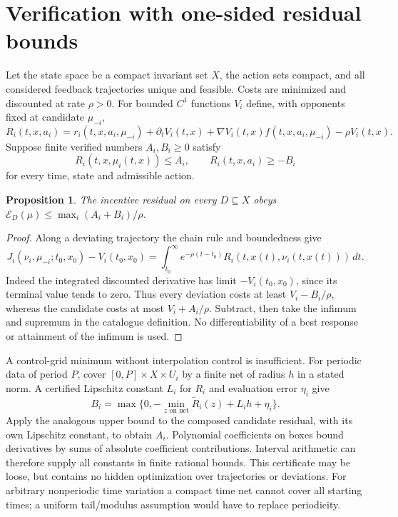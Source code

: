 \documentclass[11pt]{article}
\newtheorem{proposition}[theorem]{Proposition}
\theoremstyle{definition}
\begin{document}
\section*{Verification with one-sided residual bounds}
Let the state space be a compact invariant set $X$, the action sets compact,
and all considered feedback trajectories unique and feasible. Costs are
minimized and discounted at rate $\rho>0$. For bounded $C^1$ functions $V_i$
define, with opponents fixed at candidate $\mu_{-i}$,
\[
 R_i(t,x,a_i)=r_i(t,x,a_i,\mu_{-i})+\partial_tV_i(t,x)
 +\nabla V_i(t,x)f(t,x,a_i,\mu_{-i})-\rho V_i(t,x).
\]
Suppose finite verified numbers $A_i,B_i\ge0$ satisfy
\[
 R_i(t,x,\mu_i(t,x))\le A_i,\qquad
 R_i(t,x,a_i)\ge-B_i
\]
for every time, state and admissible action.
\begin{proposition}
The incentive residual on every $D\subseteq X$ obeys
$\mathcal E_D(\mu)\le\max_i(A_i+B_i)/\rho$.
\end{proposition}
\begin{proof}
Along a deviating trajectory the chain rule and boundedness give
\[
 J_i(\nu_i,\mu_{-i};t_0,x_0)-V_i(t_0,x_0)
 =\int_{t_0}^{\infty}e^{-\rho(t-t_0)}R_i(t,x(t),\nu_i(t,x(t)))\,dt.
\]
Indeed the integrated discounted derivative has limit $-V_i(t_0,x_0)$,
since its terminal value tends to zero. Thus every deviation costs at least
$V_i-B_i/\rho$, whereas the candidate costs at most $V_i+A_i/\rho$.
Subtract, then take the infimum and supremum in the catalogue definition.
No differentiability of a best response or attainment of the infimum is used.
\end{proof}
A control-grid minimum without interpolation control is insufficient. For
periodic data of period $P$, cover $[0,P]\times X\times U_i$ by a finite net
of radius $h$ in a stated norm. A certified Lipschitz constant $L_i$ for $R_i$
and evaluation error $\eta_i$ give
\[
 B_i=\max\{0,-\min_{z\text{ on net}}\widetilde R_i(z)+L_i h+\eta_i\}.
\]
Apply the analogous upper bound to the composed candidate residual, with
its own Lipschitz constant, to obtain $A_i$. Polynomial coefficients on boxes
bound derivatives by sums of absolute coefficient contributions. Interval
arithmetic can therefore supply all constants in finite rational bounds.
This certificate may be loose, but contains no hidden optimization over
trajectories or deviations. For arbitrary nonperiodic time variation a compact
time net cannot cover all starting times; a uniform tail/modulus assumption
would have to replace periodicity.
\end{document}
